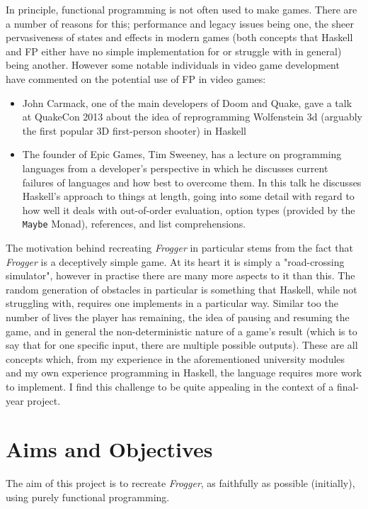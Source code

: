 \documentclass[12pt, a4paper]{report}
\begin{document}
In principle, functional programming is not often used to make games.
There are a number of reasons for this; performance and legacy issues being one, the sheer pervasiveness of states and effects in modern games (both concepts that Haskell and FP either have no simple implementation for or struggle with in general) being another.
However some notable individuals in video game development have commented on the potential use of FP in video games:
\begin{itemize}
  \item John Carmack, one of the main developers of Doom and Quake, gave a talk at QuakeCon 2013 about the idea of reprogramming Wolfenstein 3d (arguably the first popular 3D first-person shooter) in Haskell\cite{carmackspeech}
  \item The founder of Epic Games, Tim Sweeney, has a lecture on programming languages from a developer's perspective in which he discusses current failures of languages and how best to overcome them.
    In this talk he discusses Haskell's approach to things at length, going into some detail with regard to how well it deals with out-of-order evaluation, option types (provided by the \verb|Maybe| Monad), references, and list comprehensions\cite{sweeneytalk}.
\end{itemize}

\par

The motivation behind recreating \textit{Frogger} in particular stems from the fact that \textit{Frogger} is a deceptively simple game.
At its heart it is simply a "road-crossing simulator", however in practise there are many more aspects to it than this.
The random generation of obstacles in particular is something that Haskell, while not struggling with, requires one implements in a particular way.
Similar too the number of lives the player has remaining, the idea of pausing and resuming the game, and in general the non-deterministic nature of a game's result (which is to say that for one specific input, there are multiple possible outputs).
These are all concepts which, from my experience in the aforementioned university modules and my own experience programming in Haskell, the language requires more work to implement.
I find this challenge to be quite appealing in the context of a final-year project.

\section{Aims and Objectives}
The aim of this project is to recreate \textit{Frogger}, as faithfully as possible (initially), using purely functional programming.
\end{document}
